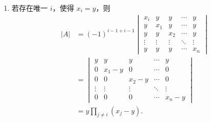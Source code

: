 \begin{exercise}
\begin{exgroup}
\begin{answer}
\begin{enumerate}
\begin{enumerate}
                        \item 若存在唯一 $i$，使得 $x_i = y$，则
                            \begin{align*}
                                |A| &= (-1)^{i - 1 + i - 1} \begin{vmatrix}
                                    x_i    & y      & y      & \cdots & y      \\
                                    y      & x_1    & y      & \cdots & y      \\
                                    y      & y      & x_2    & \cdots & y      \\
                                    \vdots & \vdots & \vdots & \ddots & \vdots \\
                                    y      & y      & y      & \cdots & x_n
                                \end{vmatrix} \\
                                &= \begin{vmatrix}
                                    y      & y       & y       & \cdots & y       \\
                                    0      & x_1 - y & 0       & \cdots & 0       \\
                                    0      & 0       & x_2 - y & \cdots & 0       \\
                                    \vdots & \vdots  & \vdots  & \ddots & \vdots  \\
                                    0      & 0       & 0       & \cdots & x_n - y
                                \end{vmatrix} \\
                                &= y \prod_{j \neq i} (x_j - y).
                            \end{align*}


\end{enumerate}
\end{enumerate}
\end{answer}
\end{exgroup}
\end{exercise}
